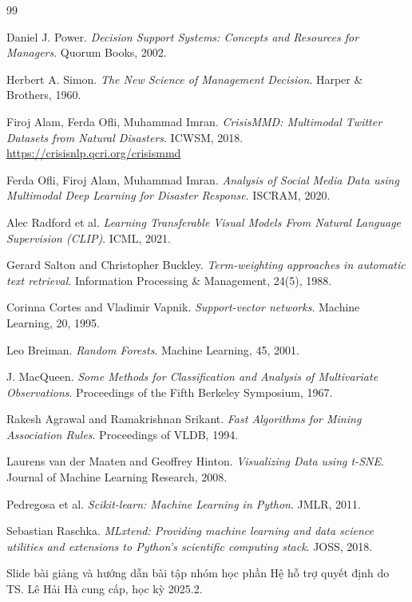 \begin{thebibliography}{99}

 Daniel J. Power.
\textit{Decision Support Systems: Concepts and Resources for Managers}.
Quorum Books, 2002.

 Herbert A. Simon.
\textit{The New Science of Management Decision}. Harper \& Brothers, 1960.

 Firoj Alam, Ferda Ofli, Muhammad Imran.
\textit{CrisisMMD: Multimodal Twitter Datasets from Natural Disasters}. ICWSM, 2018.
\url{https://crisisnlp.qcri.org/crisismmd}

 Ferda Ofli, Firoj Alam, Muhammad Imran.
\textit{Analysis of Social Media Data using Multimodal Deep Learning for Disaster Response}. ISCRAM, 2020.

 Alec Radford et al.
\textit{Learning Transferable Visual Models From Natural Language Supervision (CLIP)}. ICML, 2021.

 Gerard Salton and Christopher Buckley.
\textit{Term-weighting approaches in automatic text retrieval}.
Information Processing \& Management, 24(5), 1988.

 Corinna Cortes and Vladimir Vapnik.
\textit{Support-vector networks}. Machine Learning, 20, 1995.

 Leo Breiman.
\textit{Random Forests}. Machine Learning, 45, 2001.

 J. MacQueen.
\textit{Some Methods for Classification and Analysis of Multivariate Observations}.
Proceedings of the Fifth Berkeley Symposium, 1967.

 Rakesh Agrawal and Ramakrishnan Srikant.
\textit{Fast Algorithms for Mining Association Rules}.
Proceedings of VLDB, 1994.

 Laurens van der Maaten and Geoffrey Hinton.
\textit{Visualizing Data using t-SNE}. Journal of Machine Learning Research, 2008.

 Pedregosa et al. \textit{Scikit-learn: Machine Learning in Python}. JMLR, 2011.

 Sebastian Raschka. \textit{MLxtend: Providing machine learning and
data science utilities and extensions to Python's scientific computing stack}. JOSS, 2018.

 Slide bài giảng và hướng dẫn bài tập nhóm học phần Hệ hỗ trợ quyết định
do TS. Lê Hải Hà cung cấp, học kỳ 2025.2.
\end{thebibliography}
